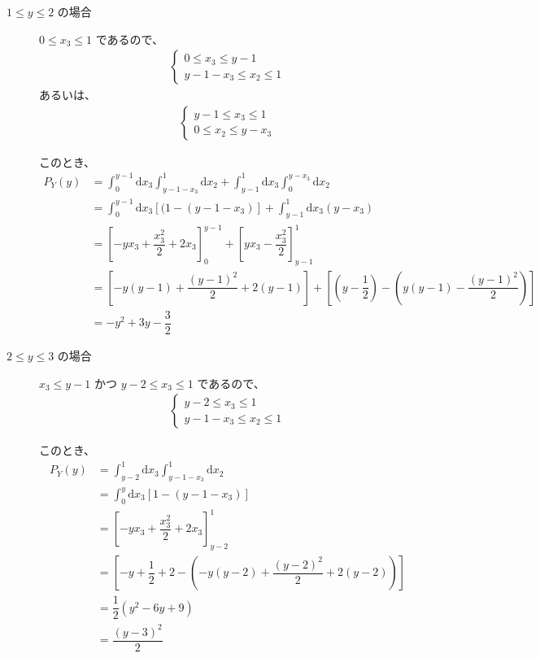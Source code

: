 \documentclass[uplatex,dvipdfmx,a4paper,11pt]{jsarticle}
\newcommand{\diff}{\mathrm d}
\begin{document}
\begin{enumerate}
\begin{description}
\item[$1 \leq y \leq 2$ の場合]
$0 \leq x_3 \leq 1$ であるので、
\begin{align*}
\begin{cases}
0\leq x_3 \leq y-1 \\
y-1-x_3\leq x_2 \leq 1
\end{cases}
\end{align*}
あるいは、
\begin{align*}
\begin{cases}
y-1 \leq x_3 \leq 1 \\
0 \leq x_2 \leq y-x_3
\end{cases}
\end{align*}

このとき、
\begin{align*}
P_Y(y) 
	&= \int_{0}^{y-1} \diff x_3 \int_{y-1-x_3}^{1} \diff x_2 + \int_{y-1}^{1} \diff x_3 \int_{0}^{y-x_3} \diff x_2 \\
	&= \int_{0}^{y-1} \diff x_3 [(1 -(y - 1 - x_3)] + \int_{y-1}^{1} \diff x_3 (y - x_3) \\
	&= \left[-y x_3 + \dfrac{x_3^2}{2} +2x_3 \right]_0^{y-1} + \left[y x_3 - \dfrac{x_3^2}{2} \right]_{y-1}^1 \\
	&= \left[ -y (y-1) + \dfrac{(y-1)^2}{2} + 2(y-1) \right] + \left[ \left( y-\dfrac{1}{2} \right) - \left(y (y-1) - \dfrac{(y-1)^2}{2} \right) \right] \\
	&= -y^2 + 3y - \dfrac{3}{2}
\end{align*}

\item[$2 \leq y \leq 3$ の場合]
$x_3 \leq y-1$ かつ $y-2 \leq x_3 \leq 1$ であるので、
\begin{align*}
\begin{cases}
y-2 \leq x_3 \leq 1 \\
y-1-x_3\leq x_2 \leq 1
\end{cases}
\end{align*}

このとき、
\begin{align*}
P_Y(y) 
	&= \int_{y-2}^{1} \diff x_3 \int_{y-1-x_3}^{1} \diff x_2 \\
	&= \int_{0}^{y} \diff x_3 [1-(y-1-x_3)] \\
	&= \left[-y x_3 + \dfrac{x_3^2}{2} + 2 x_3 \right]_{y-2}^1 \\
	&= \left[-y + \dfrac{1}{2} +2 -\left(-y (y-2) + \dfrac{(y-2)^2}{2} +2(y-2) \right) \right] \\
	&= \dfrac{1}{2}\left( y^2 -6y + 9 \right) \\
	&= \dfrac{(y-3)^2}{2}
\end{align*}


\end{description}
\end{enumerate}
\end{document}
